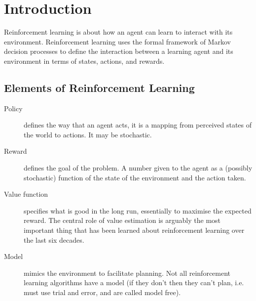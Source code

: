 \section{Introduction}
Reinforcement learning is about how an agent can learn to interact with its environment. Reinforcement learning uses the formal framework of Markov decision processes to define the interaction between a learning agent and its environment in terms of states, actions, and rewards.

\setcounter{subsection}{2}
\subsection{Elements of Reinforcement Learning}
\begin{description}
     \item[Policy] defines the way that an agent acts, it is a mapping from perceived states of the world to actions. It may be stochastic.
     \item[Reward] defines the goal of the problem. A number given to the agent as a (possibly stochastic) function of the state of the environment and the action taken.
     \item[Value function] specifies what is good in the long run, essentially to maximise the expected reward. The central role of value estimation is arguably the most important thing that has been learned about reinforcement learning over the last six decades.
     \item[Model] mimics the environment to facilitate planning. Not all reinforcement learning algorithms have a model (if they don't then they can't plan, i.e. must use trial and error, and are called model free).
\end{description}
